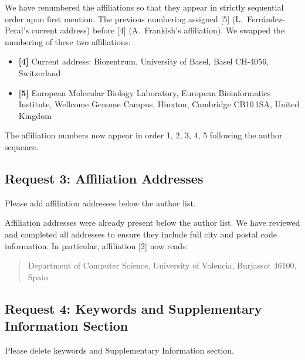 \documentclass[11pt]{article}
\begin{document}
\begin{responseboxnew}
We have renumbered the affiliations so that they appear in strictly sequential order upon first mention. The previous numbering assigned [5] (L.~Ferr\'{a}ndez-Peral's current address) before [4] (A.~Frankish's affiliation). We swapped the numbering of these two affiliations:

\begin{itemize}[nosep]
\item \textbf{[4]} Current address: Biozentrum, University of Basel, Basel CH-4056, Switzerland
\item \textbf{[5]} European Molecular Biology Laboratory, European Bioinformatics Institute, Wellcome Genome Campus, Hinxton, Cambridge CB10\,1SA, United Kingdom
\end{itemize}

The affiliation numbers now appear in order 1, 2, 3, 4, 5 following the author sequence.
\end{responseboxnew}

\subsection*{Request 3: Affiliation Addresses}

\begin{editorrequest}
Please add affiliation addresses below the author list.
\end{editorrequest}

\begin{responseboxnew}
Affiliation addresses were already present below the author list. We have reviewed and completed all addresses to ensure they include full city and postal code information. In particular, affiliation [2] now reads:

\begin{quote}
Department of Computer Science, University of Valencia, Burjassot 46100, Spain
\end{quote}
\end{responseboxnew}

\subsection*{Request 4: Keywords and Supplementary Information Section}

\begin{editorrequest}
Please delete keywords and Supplementary Information section.
\end{editorrequest}
\end{document}
